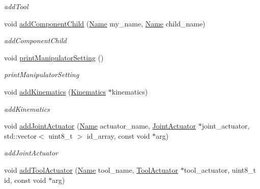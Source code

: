 \begin{DoxyCompactItemize}
\begin{DoxyCompactList}\small\item\em add\+Tool \end{DoxyCompactList}\item 
void \hyperlink{classrobotis__manipulator_1_1_robotis_manipulator_a46b8a455b56b79d21ff45c5f0961efef}{add\+Component\+Child} (\hyperlink{namespacerobotis__manipulator_a08c2d25e77a01ad75b9bb740f8ce4765}{Name} my\+\_\+name, \hyperlink{namespacerobotis__manipulator_a08c2d25e77a01ad75b9bb740f8ce4765}{Name} child\+\_\+name)
\begin{DoxyCompactList}\small\item\em add\+Component\+Child \end{DoxyCompactList}\item 
void \hyperlink{classrobotis__manipulator_1_1_robotis_manipulator_ae0325e6d7e3286a52431c9ecc8fa83e7}{print\+Manipulator\+Setting} ()
\begin{DoxyCompactList}\small\item\em print\+Manipulator\+Setting \end{DoxyCompactList}\item 
void \hyperlink{classrobotis__manipulator_1_1_robotis_manipulator_a50556f2563927f3e3f9b73f6378f152f}{add\+Kinematics} (\hyperlink{classrobotis__manipulator_1_1_kinematics}{Kinematics} $\ast$kinematics)
\begin{DoxyCompactList}\small\item\em add\+Kinematics \end{DoxyCompactList}\item 
void \hyperlink{classrobotis__manipulator_1_1_robotis_manipulator_a31742609d347630169ddc083bb390bb5}{add\+Joint\+Actuator} (\hyperlink{namespacerobotis__manipulator_a08c2d25e77a01ad75b9bb740f8ce4765}{Name} actuator\+\_\+name, \hyperlink{classrobotis__manipulator_1_1_joint_actuator}{Joint\+Actuator} $\ast$joint\+\_\+actuator, std\+::vector$<$ uint8\+\_\+t $>$ id\+\_\+array, const void $\ast$arg)
\begin{DoxyCompactList}\small\item\em add\+Joint\+Actuator \end{DoxyCompactList}\item 
void \hyperlink{classrobotis__manipulator_1_1_robotis_manipulator_a88f0868c117783b630779270875793bd}{add\+Tool\+Actuator} (\hyperlink{namespacerobotis__manipulator_a08c2d25e77a01ad75b9bb740f8ce4765}{Name} tool\+\_\+name, \hyperlink{classrobotis__manipulator_1_1_tool_actuator}{Tool\+Actuator} $\ast$tool\+\_\+actuator, uint8\+\_\+t id, const void $\ast$arg)

\end{DoxyCompactItemize}
